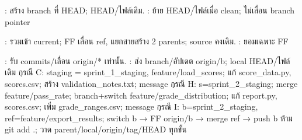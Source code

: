 \par{}: สร้าง branch ที่ HEAD; HEAD/ไฟล์เดิม. : ย้าย HEAD/ไฟล์เมื่อ clean; ไม่เลื่อน branch pointer
\par{}: รวมเข้า current; FF เลื่อน ref, แยกสายสร้าง 2 parents; source คงเดิม. : ยอมเฉพาะ FF
\par{}: รับ commits/เลื่อน origin/* เท่านั้น. : ส่ง branch/อัปเดต origin/b; local HEAD/ไฟล์เดิม
\k{กรณี C}: staging = sprint\_1\_staging, feature/load\_scores; แก้ score\_data.py, scores.csv; สร้าง validation\_notes.txt; message 
\k{กรณี H}: s=sprint\_2\_staging; merge feature/pass\_rate; branch+switch feature/grade\_distribution; แก้ report.py, scores.csv; เพิ่ม grade\_ranges.csv; message 
\k{กรณี I}: b=sprint\_2\_staging, ref=feature/export\_results; switch b → FF origin/b → merge ref → push b
\r{ห้าม git add .}; วาด parent/local/origin/tag/HEAD ทุกขั้น
